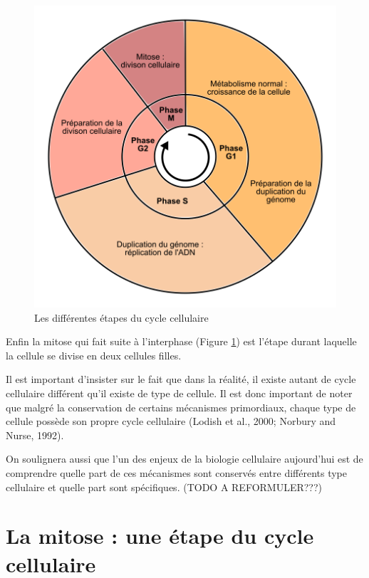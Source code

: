 \documentclass[12pt,a4paper,twoside,openright]{book}
\begin{document}
\begin{figure}[htbp]
\centering
\includegraphics{figures/intro/cycle.png}
\caption{Les différentes étapes du cycle cellulaire \label{cycle}}
\end{figure}

Enfin la mitose qui fait suite à l'interphase (Figure \ref{cycle}) est
l'étape durant laquelle la cellule se divise en deux cellules filles.

Il est important d'insister sur le fait que dans la réalité, il existe
autant de cycle cellulaire différent qu'il existe de type de cellule. Il
est donc important de noter que malgré la conservation de certains
mécanismes primordiaux, chaque type de cellule possède son propre cycle
cellulaire (Lodish et al., 2000; Norbury and Nurse, 1992).

On soulignera aussi que l'un des enjeux de la biologie cellulaire
aujourd'hui est de comprendre quelle part de ces mécanismes sont
conservés entre différents type cellulaire et quelle part sont
spécifiques. (TODO A REFORMULER???)

\section{La mitose : une étape du cycle
cellulaire}\label{la-mitose-une-uxe9tape-du-cycle-cellulaire}
\end{document}
